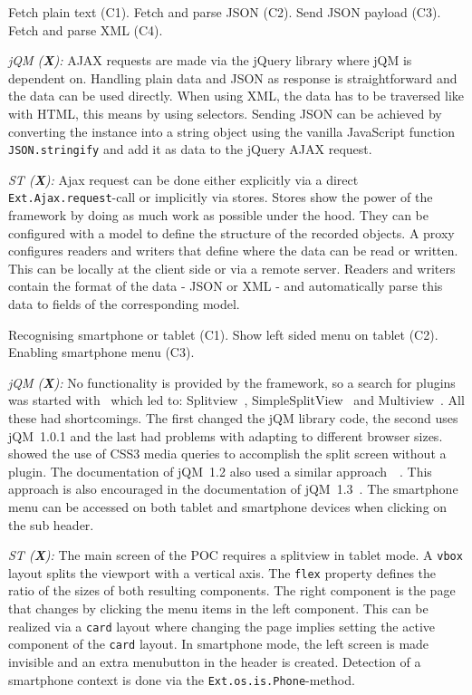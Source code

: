 \documentclass[a4paper]{artikel3}
\newcommand{\code}[1]{\texttt{#1}}
\renewcommand{\paragraph}[1]{\vspace{2mm} \noindent {\bf #1}  }
\newcommand{\framework}[2]{ \emph{#1 (\textbf{#2}): }} %
\newcommand{\challenge}[1]{\paragraph{#1}}
\begin{document}
\challenge{AJAX: text, JSON \& XML}
Fetch plain text (C1).
Fetch and parse JSON (C2).
Send JSON payload (C3).
Fetch and parse XML (C4).

\framework{jQM}{X}
AJAX requests are made via the jQuery library where jQM is dependent on.
Handling plain data and JSON as response is straightforward and the data can be used directly.
When using XML, the data has to be traversed like with HTML, this means by using selectors.
Sending JSON can be achieved by converting the instance into a string object using the vanilla JavaScript function \code{JSON.stringify} and add it as data to the jQuery AJAX request.

\framework{ST}{X}
Ajax request can be done either explicitly via a direct \code{Ext.Ajax.request}-call or implicitly via stores.  Stores show the power of the framework by doing as much work as possible under the hood.  They can be configured with a model to define the structure of the recorded objects.  A proxy configures readers and writers that define where the data can be read or written.  This can be locally at the client side or via a remote server.  Readers and writers contain the format of the data - JSON or XML - and automatically parse this data to fields of the corresponding model. 

\challenge{Device-specific layout (C1,C2,C3)}
Recognising smartphone or tablet (C1).
Show left sided menu on tablet (C2).
Enabling smartphone menu (C3).

\framework{jQM}{X}
No functionality is provided by the framework, so a search for plugins was started with~\cite{Deering2012} which led to: Splitview~\cite{Rahman2013}, SimpleSplitView~\cite{Yared2013} and Multiview~\cite{Franck2012}. 
All these had shortcomings. The first changed the jQM library code, the second uses jQM~1.0.1 and the last had problems with adapting to different browser sizes.
\cite{Hadlock2012} showed the use of CSS3 media queries to accomplish the split screen without a plugin.
The documentation of jQM~1.2 also used a similar approach~~\cite{JQuery2012b}.
This approach is also encouraged in the documentation of jQM~1.3~\cite{JQuery2013e}.
The smartphone menu can be accessed on both tablet and smartphone devices when clicking on the sub header.

\framework{ST}{X}
The main screen of the POC requires a splitview in tablet mode.  A \code{vbox} layout splits the viewport with a vertical axis.  The \code{flex} property defines the ratio of the sizes of both resulting components.  The right component is the page that changes by clicking the menu items in the left component.  This can be realized via a \code{card} layout where changing the page implies setting the active component of the \code{card} layout.
In smartphone mode,  the left screen is made invisible and an extra menubutton in the header is created.  Detection of a smartphone context is done via the \code{Ext.os.is.Phone}-method.    
\end{document}
